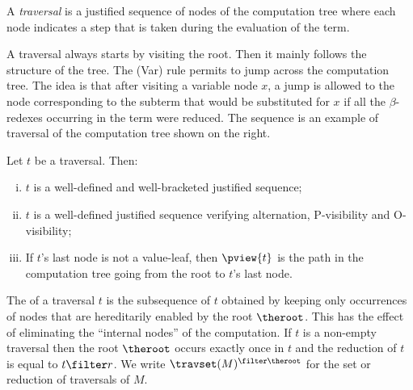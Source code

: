 A \emph{traversal} is a justified sequence of nodes of the computation tree where each node
indicates a step that is taken during the evaluation of the term.



 A traversal always starts by visiting the root. Then it mainly
follows the structure of the tree. The (Var) rule permits to jump
across the computation tree. The idea is that after visiting a
variable node $x$, a jump is allowed to the node corresponding to
the subterm that would be substituted for $x$ if all the
$\beta$-redexes occurring in the term were reduced. The sequence
 is an example of traversal of the computation tree shown on the right.

\begin{proposition}
\label{prop:pviewtrav_is_path}
Let $t$ be a traversal. Then:
\begin{enumerate}[(i)]
\item $t$ is a well-defined and well-bracketed justified sequence;
\item $t$ is a well-defined justified sequence verifying alternation, P-visibility and O-visibility;
\item If $t$'s last node is not a value-leaf, then $\pview{t}$ is the path in the computation tree going from the root to $t$'s last node.
\end{enumerate}
\end{proposition}

The  of a traversal $t$ is the subsequence of $t$
obtained by keeping only occurrences of nodes that are hereditarily
enabled by the root $\theroot$. This has the effect of eliminating
the ``internal nodes'' of the computation. If $t$ is a non-empty
traversal then the root $\theroot$ occurs exactly once in $t$ and
the reduction of $t$ is equal to $t \filter r$. We write
$\travset(M)^{\filter \theroot}$ for the set or reduction of
traversals of $M$.

